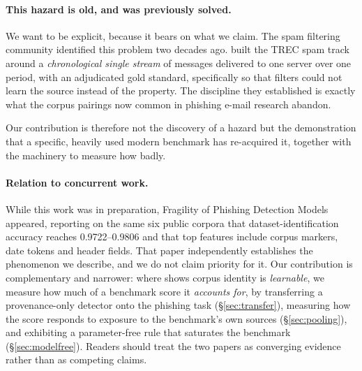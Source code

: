\documentclass[twoside,11pt]{article}
\begin{document}
\paragraph{This hazard is old, and was previously solved.}
We want to be explicit, because it bears on what we claim. The spam filtering
community identified this problem two decades ago. \citet{cormack2005,cormack2007} built the TREC spam track around a
\emph{chronological single stream} of messages delivered to one server over
one period, with an adjudicated gold standard, specifically so that filters
could not learn the source instead of the property. The discipline they
established is exactly what the corpus pairings now common in phishing
e-mail research abandon.

Our contribution is therefore not the discovery of a hazard but the
demonstration that a specific, heavily used modern benchmark has re-acquired
it, together with the machinery to measure how badly.

\paragraph{Relation to concurrent work.}
While this work was in preparation, Fragility of Phishing Detection
Models~\citep{fragility2026} appeared, reporting on the same six public corpora
that dataset-identification accuracy reaches 0.9722--0.9806 and that top
features include corpus markers, date tokens and header fields. That paper
independently establishes the phenomenon we describe, and we do not claim
priority for it. Our contribution is complementary and narrower: where \citet{fragility2026} shows corpus identity is \emph{learnable}, we measure how
much of a benchmark score it \emph{accounts for}, by transferring a
provenance-only detector onto the phishing task (\S\ref{sec:transfer}),
measuring how the score responds to exposure to the benchmark's own sources
(\S\ref{sec:pooling}), and exhibiting a parameter-free rule that saturates the
benchmark (\S\ref{sec:modelfree}). Readers should treat the two papers as
converging evidence rather than as competing claims.
\end{document}
